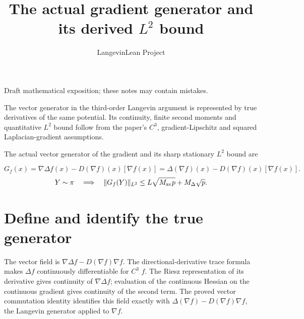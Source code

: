 \documentclass[11pt,a4paper]{article}
\title{\texorpdfstring{The actual gradient generator and its derived \(L^{2}\) bound}{The actual gradient generator and its derived L² bound}}
\author{LangevinLean Project}
\date{}
\begin{document}
\maketitle
Draft mathematical exposition; these notes may contain mistakes.


The vector generator in the third-order Langevin argument is represented by true derivatives of the same potential. Its continuity, finite second moments and quantitative \(L^{2}\) bound follow from the paper’s \(C^{3}\), gradient-Lipschitz and squared Laplacian-gradient assumptions.



The actual vector generator of the gradient and its sharp stationary \(L^2\) bound are


\[G_f(x)=\nabla\Delta f(x)-D(\nabla f)(x)[\nabla f(x)]=\Delta(\nabla f)(x)-D(\nabla f)(x)[\nabla f(x)].\]
\[Y\sim\pi\quad\Longrightarrow\quad\|G_f(Y)\|_{L^2}\le L\sqrt{M_{\rm av}p}+M_\Delta\sqrt p.\]
\section{\texorpdfstring{Define and identify the true generator}{Define and identify the true generator}}


The vector field is \(\nabla \Delta f-D(\nabla f)\nabla f\). The directional-derivative trace formula makes \(\Delta f\) continuously differentiable for \(C^{3}\) \(f\). The Riesz representation of its derivative gives continuity of \(\nabla \Delta f\); evaluation of the continuous Hessian on the continuous gradient gives continuity of the second term. The proved vector commutation identity identifies this field exactly with \(\Delta (\nabla f)-D(\nabla f)\nabla f\), the Langevin generator applied to \(\nabla f\).
\end{document}

